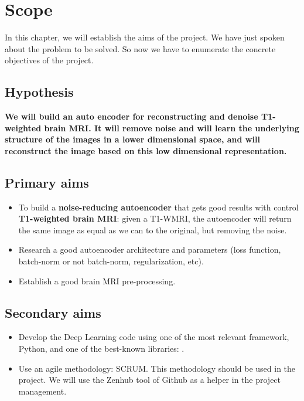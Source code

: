 \chapter{Scope}
\label{chapter:scope}

In this chapter, we will establish the aims of the project. We have just spoken about the problem to be solved. So now we have to enumerate the concrete objectives of the project. 



\section{Hypothesis}

\textbf{We will build an auto encoder for reconstructing and denoise T1-weighted brain MRI. It will remove noise and will learn the underlying structure of the images in a lower dimensional space, and will reconstruct the image based on this low dimensional representation.}

\section{Primary aims}

\begin{itemize}
    \item To build a \textbf{noise-reducing autoencoder} that gets good results with control \textbf{T1-weighted brain MRI}: given a T1-WMRI, the autoencoder will return the same image as equal as we can to the original, but removing the noise.
    \item Research a good autoencoder architecture and parameters (loss function, batch-norm or not batch-norm, regularization, etc).
    \item Establish a good brain MRI pre-processing.
\end{itemize}

\section{Secondary aims}

\begin{itemize}
    \item Develop the Deep Learning code using one of the most relevant framework, Python, and one of the best-known libraries:  .
    \item Use an agile methodology: SCRUM. This methodology should be used in the project. We will use the Zenhub tool of Github as a helper in the project management.
\end{itemize}

